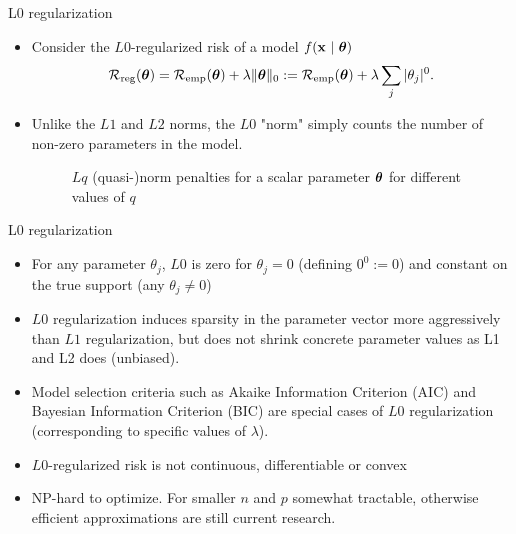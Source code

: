 \documentclass[11pt,compress,t,notes=noshow, xcolor=table]{beamer}
\begin{document}
\begin{vbframe}{L0 regularization}

  \begin{itemize}
    \item Consider the $L0$-regularized risk of a model $f(\mathbf{x} ~|~ \bm{\theta})$
  $$
  \mathcal{R}_{\text{reg}}(\bm{\theta}) = \mathcal{R}_{\text{emp}}(\bm{\theta}) + \lambda \|\bm{\theta}\|_0 := \mathcal{R}_{\text{emp}}(\bm{\theta}) + \lambda \sum_j |\theta_j|^0.
  $$
      \item Unlike the $L1$ and $L2$ norms, the $L0$ "norm" simply counts the number of non-zero parameters in the model.
      \vspace{0.3cm}
    \begin{figure}
      \centering
        \caption{\footnotesize $Lq$ (quasi-)norm penalties for a scalar parameter $\bm{\theta}$ for different values of $q$}
    \end{figure}

    \end{itemize}
    
\end{vbframe}

\begin{vbframe} {L0 regularization}

    \begin{itemize}
    \item For any parameter $\theta_j$, $L0$ is zero for $\theta_j = 0$ (defining $0^0 := 0$) and constant on the true support (any $\theta_j \neq 0$)
    \item $L0$ regularization induces sparsity in the parameter vector more aggressively than $L1$ regularization, but does not shrink concrete parameter values as L1 and L2 does (unbiased).
    \item Model selection criteria such as Akaike Information Criterion (AIC) and Bayesian Information Criterion (BIC) are special cases of $L0$ regularization (corresponding to specific values of $\lambda$).
    \item $L0$-regularized risk is not continuous, differentiable or convex
    \item NP-hard to optimize.
      For smaller $n$ and $p$ somewhat tractable, otherwise efficient approximations are still current research.
  \end{itemize}
\end{vbframe}
\end{document}

